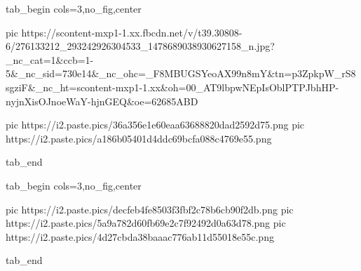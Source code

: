  
 
 
 
 


\ifcmt
  tab_begin cols=3,no_fig,center

     pic https://scontent-mxp1-1.xx.fbcdn.net/v/t39.30808-6/276133212_293242926304533_1478689038930627158_n.jpg?_nc_cat=1&ccb=1-5&_nc_sid=730e14&_nc_ohc=_F8MBUGSYeoAX99n8mY&tn=p3ZpkpW_rS8sgziF&_nc_ht=scontent-mxp1-1.xx&oh=00_AT9lbpwNEpIsOblPTPJbhHP-nyjnXisOJnoeWaY-hjnGEQ&oe=62685ABD

		 pic https://i2.paste.pics/36a356e1e60eaa63688820dad2592d75.png
		 pic https://i2.paste.pics/a186b05401d4ddc69bcfa088c4769e55.png

  tab_end
\fi

\ifcmt
  tab_begin cols=3,no_fig,center

     pic https://i2.paste.pics/decfeb4fe8503f3fbf2c78b6cb90f2db.png
		 pic https://i2.paste.pics/5a9a782d60fb69e2c7f92492d0a63d78.png
		 pic https://i2.paste.pics/4d27cbda38baaac776ab11d55018e55c.png

  tab_end
\fi
